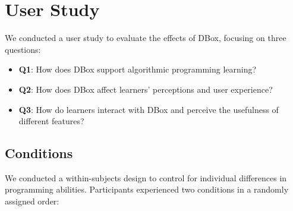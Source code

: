 

\section{User Study}




We conducted a user study to evaluate the effects of DBox, focusing on three questions:
\begin{itemize}
    \item \textbf{Q1}: How does DBox support algorithmic programming learning?
    \item \textbf{Q2}: How does DBox affect learners' perceptions and user experience?
    \item \textbf{Q3}: How do learners interact with DBox and perceive the usefulness of different features?
\end{itemize}





\subsection{Conditions}
We conducted a within-subjects design to control for individual differences in programming abilities. Participants experienced two conditions in a randomly assigned order:


